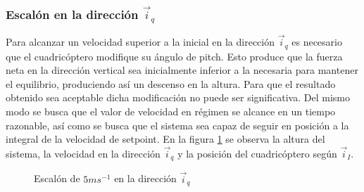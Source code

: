 \documentclass[main]{subfiles}
\begin{document}
\subsubsection*{Escal\'on en la direcci\'on $\vec{i}_q$}
Para alcanzar un velocidad superior a la inicial en la direcci\'on $\vec{i}_q$ es necesario que el cuadric\'optero modifique su \'angulo de pitch. Esto produce que la fuerza neta en la direcci\'on vertical sea inicialmente inferior a la necesaria para mantener el equilibrio, produciendo as\'i un descenso en la altura. Para que el resultado obtenido sea aceptable dicha modificaci\'on no puede ser significativa. Del mismo modo se busca que el valor de velocidad en r\'egimen se alcance en un tiempo razonable, as\'i como se busca que el sistema sea capaz de seguir en posici\'on a la integral de la velocidad de setpoint. En la figura \ref{fig:rec_esc_x} se observa la altura del sistema, la velocidad en la direcci\'on $\vec{i}_q$ y la posici\'on del cuadric\'optero seg\'un $\vec{i}_I$. 

\begin{figure}
  \centering
 
  \caption{Escal\'on de $5m s^{-1}$ en la direcci\'on $\vec{i}_q$}
  \label{fig:rec_esc_x}
\end{figure}
\end{document}
